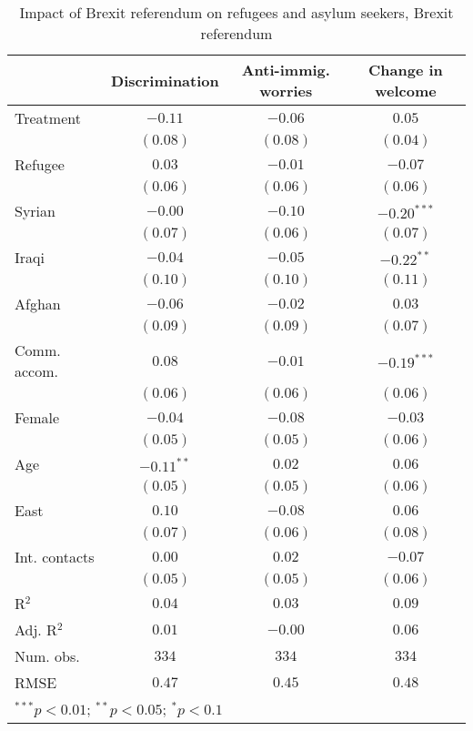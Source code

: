 
\begin{table}
\caption{Impact of Brexit referendum on refugees and asylum seekers, Brexit referendum}
\begin{center}
\begin{tabular}{l c c c}
\toprule
 & Discrimination & Anti-immig. worries & Change in welcome \\
\midrule
Treatment     & $-0.11$      & $-0.06$  & $0.05$        \\
              & $(0.08)$     & $(0.08)$ & $(0.04)$      \\
Refugee       & $0.03$       & $-0.01$  & $-0.07$       \\
              & $(0.06)$     & $(0.06)$ & $(0.06)$      \\
Syrian        & $-0.00$      & $-0.10$  & $-0.20^{***}$ \\
              & $(0.07)$     & $(0.06)$ & $(0.07)$      \\
Iraqi         & $-0.04$      & $-0.05$  & $-0.22^{**}$  \\
              & $(0.10)$     & $(0.10)$ & $(0.11)$      \\
Afghan        & $-0.06$      & $-0.02$  & $0.03$        \\
              & $(0.09)$     & $(0.09)$ & $(0.07)$      \\
Comm. accom.  & $0.08$       & $-0.01$  & $-0.19^{***}$ \\
              & $(0.06)$     & $(0.06)$ & $(0.06)$      \\
Female        & $-0.04$      & $-0.08$  & $-0.03$       \\
              & $(0.05)$     & $(0.05)$ & $(0.06)$      \\
Age           & $-0.11^{**}$ & $0.02$   & $0.06$        \\
              & $(0.05)$     & $(0.05)$ & $(0.06)$      \\
East          & $0.10$       & $-0.08$  & $0.06$        \\
              & $(0.07)$     & $(0.06)$ & $(0.08)$      \\
Int. contacts & $0.00$       & $0.02$   & $-0.07$       \\
              & $(0.05)$     & $(0.05)$ & $(0.06)$      \\
\midrule
R$^2$         & $0.04$       & $0.03$   & $0.09$        \\
Adj. R$^2$    & $0.01$       & $-0.00$  & $0.06$        \\
Num. obs.     & $334$        & $334$    & $334$         \\
RMSE          & $0.47$       & $0.45$   & $0.48$        \\
\bottomrule
\multicolumn{4}{l}{\scriptsize{$^{***}p<0.01$; $^{**}p<0.05$; $^{*}p<0.1$}}
\end{tabular}
\label{tab_host_brexit}
\end{center}
\end{table}
